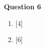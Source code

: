 \noindent
\textbf{Question 6}
\begin{enumerate}[label=(\roman*)]

    \item \hfill [4]

    \item \hfill [6]

\end{enumerate}



